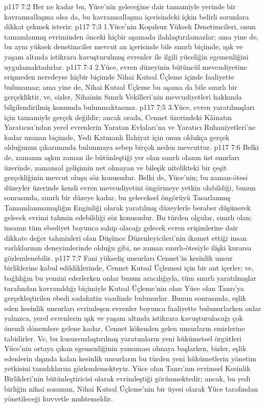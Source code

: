\vs p117 7:2 Her ne kadar bu, Yüce’nin geleceğine dair tamamiyle yerinde bir kavramsallaşma olsa da, bu kavramsallaşma içerisindeki içkin belirli sorunlara dikkat çekmek isteriz:
\vs p117 7:3 1.\bibnobreakspace Yüce’nin Koşulsuz Yüksek Denetimcileri, onun tamamlanmış evriminden önceki hiçbir aşamada ilahlaştırılamazlar; ama yine de, bu aynı yüksek denetimciler mevcut an içerisinde bile sınırlı biçimde, ışık ve yaşam altında istikrara kavuşturulmuş evrenler ile ilgili yüceliğin egemenliğini uygulamaktadırlar.
\vs p117 7:4 2.\bibnobreakspace Yüce, evren düzeyinin bütüncül mevcudiyetine erişmeden neredeyse hiçbir biçimde Nihai Kutsal Üçleme içinde faaliyette bulunamaz; ama yine de, Nihai Kutsal Üçleme bu aşama da bile sınırlı bir gerçekliktir, ve, sizler, Nihainin Sınırlı Vekilleri’nin mevcudiyetleri hakkında bilgilendirilmiş konumda bulunmaktasınız.
\vs p117 7:5 3.\bibnobreakspace Yüce, evren yaratılmışları için tamamiyle gerçek değildir; ancak orada, Cennet üzerindeki Kâinatın Yaratıcısı’ndan yerel evrenlerin Yaratan Evlaları’na ve Yaratıcı Ruhaniyetleri’ne kadar uzanan biçimde, Yedi Katmanlı İlahiyat için onun oldukça gerçek olduğunun çıkarımında bulunmaya sebep birçok neden mevcuttur.
\vs p117 7:6 Belki de, zamanın aşkın zaman ile bütünleştiği yer olan sınırlı olanın üst sınırları üzerinde, zamansal gelişimin net olmayan ve bileşik nitelikteki bir çeşit gerçekliğinin mevcut oluşu söz konusudur. Belki de, Yüce’nin; bu zaman\hyp{}ötesi düzeyler üzerinde kendi evren mevcudiyetini öngörmeye yetkin olabildiği, bunun sonrasında, sınırlı bir düzeye kadar, bu geleceksel öngörüyü Tasarlanmış Tamamlanmamışlığın Enginliği olarak yaratılmış düzeylerle beraber düşünerek gelecek evrimi tahmin edebildiği söz konusudur. Bu türden olgular, sınırlı olan; insanın tüm ebediyet boyunca sahip olacağı gelecek evren erişimlerine dair dikkate değer tahminleri olan Düşünce Düzenleyicileri’nin ikamet ettiği insan varlıklarının deneyimlerinde olduğu gibi, ne zaman sınırlı\hyp{}ötesiyle ilişki kurarsa gözlemlenebilir.
\vs p117 7:7 Fani yükseliş unsurları Cennet’in kesinlik unsur birliklerine kabul edildiklerinde, Cennet Kutsal Üçlemesi için bir ant içerler; ve, bağlılığın bu yemini ederlerken onlar bunun aracılığıyla, tüm sınırlı yaratılmışlar tarafından kavranıldığı biçimiyle Kutsal Üçleme’nin  olan Yüce olan Tanrı’ya gerçekleştirilen ebedi sadakatin vaadinde bulunurlar. Bunun sonrasında, eşlik eden kesinlik unsurları evrimleşen evrenler boyunca faaliyette bulunurlarken onlar yalnızca, yerel evrenlerin ışık ve yaşam altında istikrara kavuşturulacağı çok önemli dönemlere gelene kadar, Cennet kökenden gelen unsurların emirlerine tabidirler. Ve, bu kusursuzlaştırılmış yaratımların yeni hükümetsel örgütleri Yüce’nin ortaya çıkan egemenliğinin yansıması olmaya başlarken, bizler, eşlik edenlerin dışında kalan kesinlik unsurların bu türden yeni hükümetlerin yönetim yetkisini tanıdıklarını gözlemlemekteyiz. Yüce olan Tanrı’nın evrimsel Kesinlik Birlikleri’nin bütünleştiricisi olarak evrimleştiği görünmektedir; ancak, bu yedi birliğin nihai sonunun, Nihai Kutsal Üçleme’nin bir üyesi olarak Yüce tarafından yönetileceği kuvvetle muhtemeldir.
